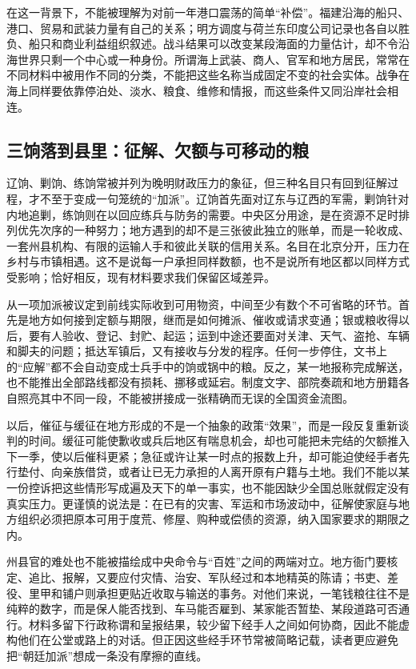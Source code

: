 在这一背景下，不能被理解为对前一年港口震荡的简单“补偿”。福建沿海的船只、港口、贸易和武装力量有自己的关系；明方调度与荷兰东印度公司记录也各自以胜负、船只和商业利益组织叙述。战斗结果可以改变某段海面的力量估计，却不令沿海世界只剩一个中心或一种身份。所谓海上武装、商人、官军和地方居民，常常在不同材料中被用作不同的分类，不能把这些名称当成固定不变的社会实体。战争在海上同样要依靠停泊处、淡水、粮食、维修和情报，而这些条件又同沿岸社会相连。

\subsection{三饷落到县里：征解、欠额与可移动的粮}

辽饷、剿饷、练饷常被并列为晚明财政压力的象征，但三种名目只有回到征解过程，才不至于变成一句笼统的“加派”。辽饷首先面对辽东与辽西的军需，剿饷针对内地追剿，练饷则在以回应练兵与防务的需要。中央区分用途，是在资源不足时排列优先次序的一种努力；地方遇到的却不是三张彼此独立的账单，而是一轮收成、一套州县机构、有限的运输人手和彼此关联的信用关系。名目在北京分开，压力在乡村与市镇相遇。这不是说每一户承担同样数额，也不是说所有地区都以同样方式受影响；恰好相反，现有材料要求我们保留区域差异。

从一项加派被议定到前线实际收到可用物资，中间至少有数个不可省略的环节。首先是地方如何接到定额与期限，继而是如何摊派、催收或请求变通；银或粮收得以后，要有人验收、登记、封贮、起运；运到中途还要面对关津、天气、盗抢、车辆和脚夫的问题；抵达军镇后，又有接收与分发的程序。任何一步停住，文书上的“应解”都不会自动变成士兵手中的饷或锅中的粮。反之，某一地报称完成解送，也不能推出全部路线都没有损耗、挪移或延宕。制度文字、部院奏疏和地方册籍各自照亮其中不同一段，不能被拼接成一张精确而无误的全国资金流图。

以后，催征与缓征在地方形成的不是一个抽象的政策“效果”，而是一段反复重新谈判的时间。缓征可能使歉收或兵后地区有喘息机会，却也可能把未完结的欠额推入下一季，使以后催科更紧；急征或许让某一时点的报数上升，却可能迫使经手者先行垫付、向亲族借贷，或者让已无力承担的人离开原有户籍与土地。我们不能以某一份控诉把这些情形写成遍及天下的单一事实，也不能因缺少全国总账就假定没有真实压力。更谨慎的说法是：在已有的灾害、军运和市场波动中，征解使家庭与地方组织必须把原本可用于度荒、修屋、购种或偿债的资源，纳入国家要求的期限之内。

州县官的难处也不能被描绘成中央命令与“百姓”之间的两端对立。地方衙门要核定、追比、报解，又要应付灾情、治安、军队经过和本地精英的陈请；书吏、差役、里甲和铺户则承担更贴近收取与输送的事务。对他们来说，一笔钱粮往往不是纯粹的数字，而是保人能否找到、车马能否雇到、某家能否暂垫、某段道路可否通行。材料多留下行政称谓和呈报结果，较少留下经手人之间如何协商，因此不能虚构他们在公堂或路上的对话。但正因这些经手环节常被简略记载，读者更应避免把“朝廷加派”想成一条没有摩擦的直线。

